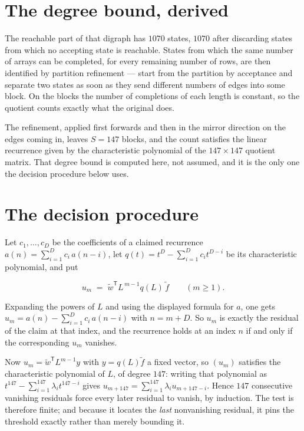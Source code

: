 \documentclass[11pt]{article}
\theoremstyle{definition}
\begin{document}
\section{The degree bound, derived}

The reachable part of that digraph has $1070$ states, $1070$ after discarding states from which no accepting state is reachable. States from which the same number of arrays can be completed, for every remaining number of rows, are then identified by partition refinement --- start from the partition by acceptance and separate two states as soon as they send different numbers of edges into some block. On the blocks the number of completions of each length is constant, so the quotient counts exactly what the original does.

The refinement, applied first forwards and then in the mirror direction on the edges coming in, leaves $S = 147$ blocks, and the count satisfies the linear recurrence given by the characteristic polynomial of the $147 \times 147$ quotient matrix. That degree bound is computed here, not assumed, and it is the only one the decision procedure below uses.

\section{The decision procedure}

Let $c_1,\dots,c_D$ be the coefficients of a claimed recurrence $a(n) = \sum_{i=1}^{D} c_i\,a(n-i)$, let $q(t) = t^{D} - \sum_{i=1}^{D} c_i t^{D-i}$ be its characteristic polynomial, and put

\[u_m \;=\; \tilde w^{\mathsf T} L^{\,m-1} q(L)\,\tilde f \qquad (m \ge 1).\]

Expanding the powers of $L$ and using the displayed formula for $a$, one gets $u_m = a(n) - \sum_{i=1}^{D} c_i\,a(n-i)$ with $n = m + D$. So $u_m$ is exactly the residual of the claim at that index, and the recurrence holds at an index $n$ if and only if the corresponding $u_m$ vanishes.

Now $u_m = \tilde w^{\mathsf T} L^{m-1} y$ with $y = q(L)\tilde f$ a fixed vector, so $(u_m)$ satisfies the characteristic polynomial of $L$, of degree $147$: writing that polynomial as $t^{147} - \sum_{i=1}^{147} \lambda_i t^{147-i}$ gives $u_{m+147} = \sum_{i=1}^{147} \lambda_i u_{m+147-i}$. Hence $147$ consecutive vanishing residuals force every later residual to vanish, by induction. The test is therefore finite; and because it locates the {\itshape last} nonvanishing residual, it pins the threshold exactly rather than merely bounding it.
\end{document}
